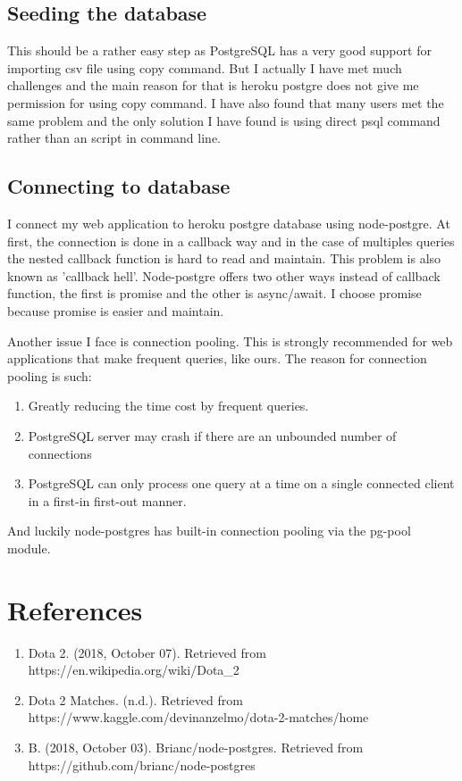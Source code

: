 \documentclass[a4paper]{article}
\begin{document}
\subsection{Seeding the database}
This should be a rather easy step as PostgreSQL has a very good support for importing csv file using copy command. But I actually I have met much challenges and the main reason for that is heroku postgre does not give me permission for using copy command. I have also found that many users met the same problem and the only solution I have found is using direct psql command rather than an script in command line.
\subsection{Connecting to database}
I connect my web application to heroku postgre database using node-postgre. At first, the connection is done in a callback way and in the case of multiples queries the nested callback function is hard to read and maintain. This problem is also known as 'callback hell'. Node-postgre offers two other ways instead of callback function, the first is promise and the other is async/await. I choose promise because promise is easier and maintain. \par
\noindent Another issue I face is connection pooling. This is strongly recommended for web applications that make frequent queries, like ours. The reason for connection pooling is such:
\begin{enumerate}
	\item Greatly reducing the time cost by frequent queries.
	\item PostgreSQL server may crash if there are an unbounded number of connections
	\item PostgreSQL can only process one query at a time on a single connected client in a first-in first-out manner.
\end{enumerate}
And luckily node-postgres has built-in connection pooling via the pg-pool module.
\section{References}
\begin{enumerate}

	\item Dota 2. (2018, October 07). Retrieved from https://en.wikipedia.org/wiki/Dota\_2
	\item Dota 2 Matches. (n.d.). Retrieved from https://www.kaggle.com/devinanzelmo/dota-2-matches/home
	\item B. (2018, October 03). Brianc/node-postgres. Retrieved from https://github.com/brianc/node-postgres
	
\end{enumerate}
\end{document}
